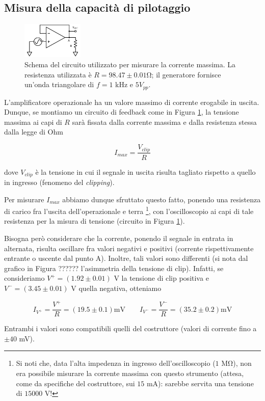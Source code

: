 \subsection{Misura della capacità di pilotaggio}

\begin{figure}
  \begin{center}
    \includegraphics[width=0.26\textwidth]{../E03/latex/max_current.pdf}
  \end{center}
  \caption{Schema del circuito utilizzato per misurare la corrente massima. La resistenza utilizzata è $R=98.47\pm0.01$\si{\ohm}; il generatore fornisce un'onda triangolare di $f=1$ \si{\kilo\hertz} e $5 V_{pp}$.}
  \label{cir3:max_current}
\end{figure}

L'amplificatore operazionale ha un valore massimo di corrente erogabile in uscita. Dunque, se montiamo un circuito di feedback come in Figura \ref{cir3:max_current}, la tensione massima ai capi di $R$ sarà fissata dalla corrente massima e dalla resistenza stessa dalla legge di Ohm

$$I_{max} = \frac{V_{clip}}{R}$$

dove $V_{clip}$ è la tensione in cui il segnale in uscita risulta tagliato rispetto a quello in ingresso (fenomeno del \textit{clipping}).

Per misurare $I_{max}$ abbiamo dunque sfruttato questo fatto, ponendo una resistenza di carico fra l'uscita dell'operazionale e terra \footnote{Si noti che, data l'alta impedenza in ingresso dell'oscilloscopio ($1$ \si{\mega\ohm}), non era possibile misurare la corrente massima con questo strumento (attesa, come da specifiche del costruttore, sui $15$ \si{\milli\ampere}): sarebbe servita una tensione di $15000$ \si{\volt}!}, con l'oscilloscopio ai capi di tale resistenza per la misura di tensione (circuito in Figura \ref{cir3:max_current}).

Bisogna però considerare che la corrente, ponendo il segnale in entrata in alternata, risulta oscillare fra valori negativi e positivi (corrente rispettivamente entrante o uscente dal punto A). Inoltre, tali valori sono differenti (si nota dal grafico in Figura ?????? l'asimmetria della tensione di clip). Infatti, se consideriamo $V^+ = (1.92 \pm 0.01)$ \si{\volt} la tensione di clip positiva e $V^- = (3.45 \pm 0.01)$ \si{\volt} quella negativa, otteniamo

$$I_{V^+} = \frac{V^+}{R} = (19.5 \pm 0.1) \si{\milli\volt}  \qquad I_{V^-} = \frac{V^-}{R} = (35.2 \pm 0.2) \si{\milli\volt}$$

Entrambi i valori sono compatibili quelli del costruttore (valori di corrente fino a $\pm 40$ \si{\milli\volt}).